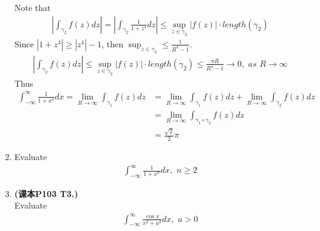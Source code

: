 \begin{enumerate}
\begin{solution}
		Note that
		\begin{align}
			\left| \int_{\gamma_2}{f(z) dz} \right| 
			= \left| \int_{\gamma_2}{\frac{1}{1 + z^4} dz} \right|
			\leq  \sup_{z \in \gamma_2}{\left| f(z) \right|} \cdot length(\gamma_2)
		\end{align}
		Since $\left| 1 + z^4 \right| \geq \left| z^4 \right| - 1$, then $\sup_{z \in \gamma_2} \leq \frac{1}{R^4 - 1}$.
		\begin{align}
			\left| \int_{\gamma_2}{f(z) dz} \right|
			\leq \sup_{z \in \gamma_2}{\left| f(z) \right|} \cdot length(\gamma_2)
			\leq \frac{\pi R}{R^4 - 1} \to 0 , \,\, as \,\, R \to \infty
		\end{align}
		Thus
		\begin{align}
			\int_{-\infty}^{\infty}{\frac{1}{1 + x^4} dx} 
			= \lim_{R \to \infty}{\int_{\gamma_1}{f(z) dz}}
			&= \lim_{R \to \infty}{\int_{\gamma_1}{f(z) dz}} + \lim_{R \to \infty}{\int_{\gamma_2}{f(z) dz}} \\
			&= \lim_{R \to \infty}{\int_{\gamma_1 \circ \gamma_2}{f(z) dz}} \\
			&= \frac{\sqrt{2}}{2} \pi
		\end{align}
	\end{solution}
	
	\newpage
	
	\item Evaluate
	\begin{align}
		\int_{-\infty}^{\infty}{\frac{1}{1 + x^n} dx} , \,\, n \geq 2
	\end{align}
	
	\vspace{2em}
	
	\item \textbf{(课本P103 T3.)}\\
	Evaluate
	\begin{align}
		\int_{-\infty}^{\infty}{\frac{\cos{x}}{x^2 + a^2} dx} , \,\, a > 0
	\end{align}
	

\end{enumerate}
